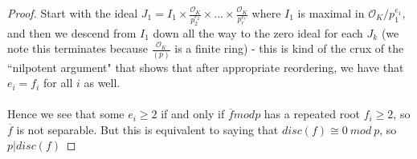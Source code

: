 \begin{proof}
Start with the ideal $J_1 = I_1 \times \frac{\mathcal{O}_K}{p_2^{e_2}} \times ... \times \frac{\mathcal{O}_K}{p_r^{e_r}}$ where $I_1$ is maximal in $\mathcal{O}_K/p_1^{e_1}$, and then we descend from $I_1$ down all the way to the zero ideal for each $J_k$ (we note this terminates because $\frac{\mathcal{O}_K}{(p)}$ is a finite ring) - this is kind of the crux of the ``nilpotent argument" that shows that after appropriate reordering, we have that $e_i = f_i$ for all $i$ as well.\\\\
Hence we see that some $e_i \geq 2$ if and only if $\overline{f} mod p$ has a repeated root $f_i \geq 2$, so $\overline{f}$ is not separable. But this is equivalent to saying that $disc(f) \cong 0\ mod\ p$, so $p | disc(f)$
\end{proof}